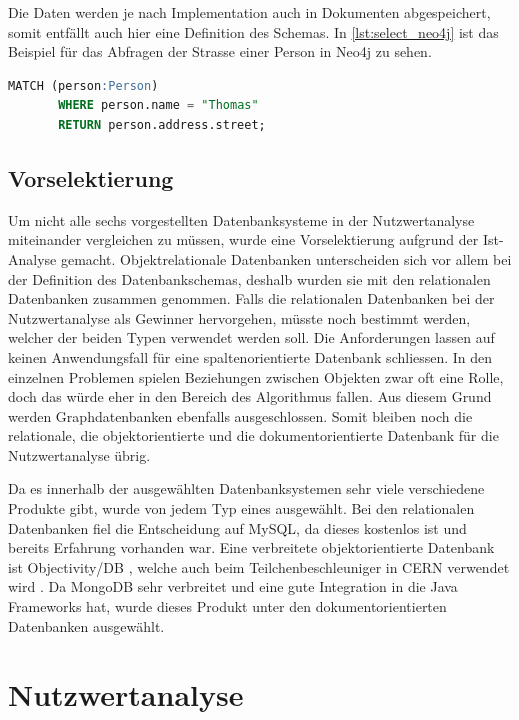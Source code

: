 Die Daten werden je nach Implementation auch in Dokumenten abgespeichert, somit entfällt auch hier eine Definition des Schemas. In \autoref{lst:select_neo4j} ist das Beispiel 
für das Abfragen der Strasse einer Person in Neo4j zu sehen.

\begin{lstlisting}[language=SQL, caption=Abfrage in Neo4j, label=lst:select_neo4j]  
       MATCH (person:Person)
       WHERE person.name = "Thomas"
       RETURN person.address.street;
\end{lstlisting}

\subsection{Vorselektierung}\label{preselection}
Um nicht alle sechs vorgestellten Datenbanksysteme in der Nutzwertanalyse miteinander vergleichen zu müssen, wurde eine Vorselektierung aufgrund der Ist-Analyse gemacht. 
Objektrelationale Datenbanken unterscheiden sich vor allem bei der Definition des Datenbankschemas, deshalb wurden sie mit den relationalen Datenbanken zusammen genommen. Falls die 
relationalen Datenbanken bei der Nutzwertanalyse als Gewinner hervorgehen, müsste noch bestimmt werden, welcher der beiden Typen verwendet werden soll. Die Anforderungen lassen auf 
keinen Anwendungsfall für eine spaltenorientierte Datenbank schliessen. In den einzelnen Problemen spielen Beziehungen zwischen Objekten zwar oft eine Rolle, doch das würde eher in den 
Bereich des Algorithmus fallen. Aus diesem Grund werden Graphdatenbanken ebenfalls ausgeschlossen. Somit bleiben noch die relationale, die objektorientierte und die dokumentorientierte 
Datenbank für die Nutzwertanalyse übrig.

Da es innerhalb der ausgewählten Datenbanksystemen sehr viele verschiedene Produkte gibt, wurde von jedem Typ eines ausgewählt. Bei den relationalen Datenbanken fiel die 
Entscheidung auf MySQL\cite{mysql}, da dieses kostenlos ist und bereits Erfahrung vorhanden war. Eine verbreitete objektorientierte Datenbank ist Objectivity/DB \cite{objectivitydb}, welche 
auch beim Teilchenbeschleuniger in CERN verwendet wird \cite{cern_objectivity}. Da MongoDB \cite{mongodb} sehr verbreitet und eine gute Integration in die Java Frameworks hat, 
wurde dieses Produkt unter den dokumentorientierten Datenbanken ausgewählt.

\newpage
\section{Nutzwertanalyse}\label{architektur_nutzwertanalyse}

